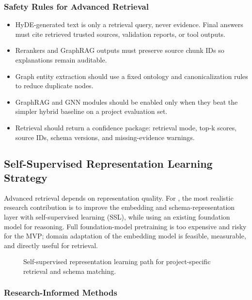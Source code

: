 \subsubsection{Safety Rules for Advanced Retrieval}

\begin{itemize}
  \item HyDE-generated text is only a retrieval query, never evidence. Final answers must cite retrieved trusted sources, validation reports, or tool outputs.
  \item Rerankers and GraphRAG outputs must preserve source chunk IDs so explanations remain auditable.
  \item Graph entity extraction should use a fixed ontology and canonicalization rules to reduce duplicate nodes.
  \item GraphRAG and GNN modules should be enabled only when they beat the simpler hybrid baseline on a project evaluation set.
  \item Retrieval should return a confidence package: retrieval mode, top-k scores, source IDs, schema versions, and missing-evidence warnings.
\end{itemize}

\subsection{Self-Supervised Representation Learning Strategy}

Advanced retrieval depends on representation quality. For \projectname{}, the most realistic research contribution is to improve the embedding and schema-representation layer with self-supervised learning (SSL), while using an existing foundation model for reasoning. Full foundation-model pretraining is too expensive and risky for the MVP; domain adaptation of the embedding model is feasible, measurable, and directly useful for retrieval.

\begin{figure}[H]
  \centering
  \resizebox{\textwidth}{!}{}
  \caption{Self-supervised representation learning path for project-specific retrieval and schema matching.}
  \label{fig:self-supervised-learning}
\end{figure}

\subsubsection{Research-Informed Methods}

